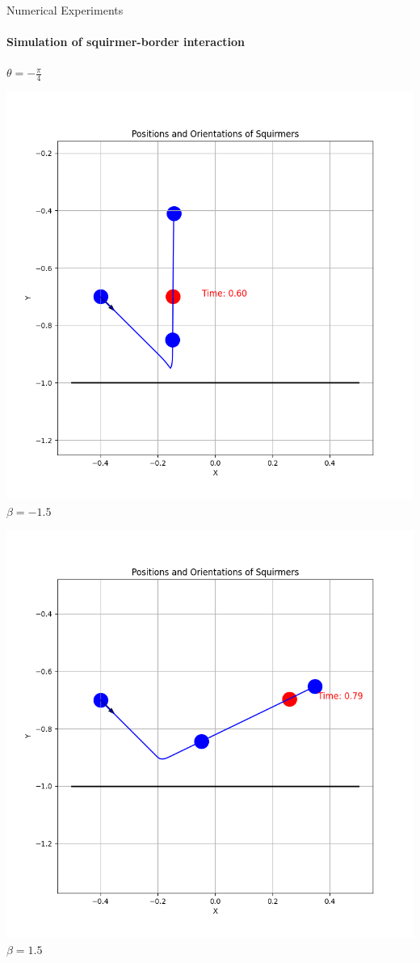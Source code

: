 \documentclass{beamer}
\begin{document}
\begin{frame}{Numerical Experiments}
    \framesubtitle{Simulation of squirmer-border interaction}
    \begin{center}
        \textbf{$\theta = -\frac{\pi}{4}$}
    \end{center}
    \begin{minipage}{0.49\textwidth}
        \centering
        \includegraphics[width=1\textwidth]{../../graphs/simulations/border/betam1_5/mpi_4.png}
        $\beta = -1.5$
    \end{minipage}
    \begin{minipage}{0.49\textwidth}
        \centering
        \includegraphics[width=1\textwidth]{../../graphs/simulations/border/beta1_5/mpi_4.png}
        $\beta = 1.5$
    \end{minipage}
\end{frame}
\end{document}
